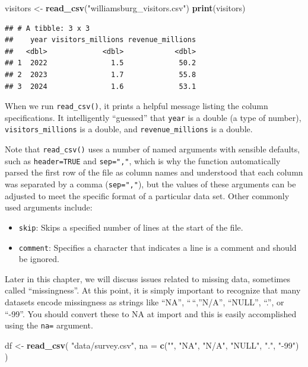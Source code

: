 \documentclass[
  11pt,
]{article}
\newenvironment{Shaded}{\begin{snugshade}}{\end{snugshade}}
\newcommand{\AttributeTok}[1]{\textcolor[rgb]{0.13,0.29,0.53}{#1}}
\newcommand{\FunctionTok}[1]{\textcolor[rgb]{0.13,0.29,0.53}{\textbf{#1}}}
\newcommand{\NormalTok}[1]{#1}
\newcommand{\OtherTok}[1]{\textcolor[rgb]{0.56,0.35,0.01}{#1}}
\newcommand{\StringTok}[1]{\textcolor[rgb]{0.31,0.60,0.02}{#1}}
\providecommand{\tightlist}{%
  \setlength{\itemsep}{0pt}\setlength{\parskip}{0pt}}
\begin{document}
\begin{Shaded}
\begin{Highlighting}[]
\NormalTok{visitors }\OtherTok{\textless{}{-}} \FunctionTok{read\_csv}\NormalTok{(}\StringTok{"williamsburg\_visitors.csv"}\NormalTok{)}
\FunctionTok{print}\NormalTok{(visitors)}
\end{Highlighting}
\end{Shaded}

\begin{verbatim}
## # A tibble: 3 x 3
##    year visitors_millions revenue_millions
##   <dbl>             <dbl>            <dbl>
## 1  2022               1.5             50.2
## 2  2023               1.7             55.8
## 3  2024               1.6             53.1
\end{verbatim}

When we run \texttt{read\_csv()}, it prints a helpful message listing
the column specifications. It intelligently ``guessed'' that
\texttt{year} is a double (a type of number),
\texttt{visitors\_millions} is a double, and \texttt{revenue\_millions}
is a double.

Note that \texttt{read\_csv()} uses a number of named arguments with
sensible defaults, such as \texttt{header=TRUE} and \texttt{sep=","},
which is why the function automatically parsed the first row of the file
as column names and understood that each column was separated by a comma
(\texttt{sep=","}), but the values of these arguments can be adjusted to
meet the specific format of a particular data set. Other commonly used
arguments include:

\begin{itemize}
\tightlist
\item
  \texttt{skip}: Skips a specified number of lines at the start of the
  file.
\item
  \texttt{comment}: Specifies a character that indicates a line is a
  comment and should be ignored.
\end{itemize}

Later in this chapter, we will discuss issues related to missing data,
sometimes called ``missingness''. At this point, it is simply important
to recognize that many datasets encode missingness as strings like
``NA'', ``\,``,''N/A'', ``NULL'', ``.'', or ``-99''. You should convert
these to NA at import and this is easily accomplished using the
\texttt{na=} argument.

\begin{Shaded}
\begin{Highlighting}[]
\NormalTok{df }\OtherTok{\textless{}{-}} \FunctionTok{read\_csv}\NormalTok{(}
  \StringTok{"data/survey.csv"}\NormalTok{,}
  \AttributeTok{na =} \FunctionTok{c}\NormalTok{(}\StringTok{""}\NormalTok{, }\StringTok{"NA"}\NormalTok{, }\StringTok{"N/A"}\NormalTok{, }\StringTok{"NULL"}\NormalTok{, }\StringTok{"."}\NormalTok{, }\StringTok{"{-}99"}\NormalTok{)}
\NormalTok{)}
\end{Highlighting}
\end{Shaded}
\end{document}
